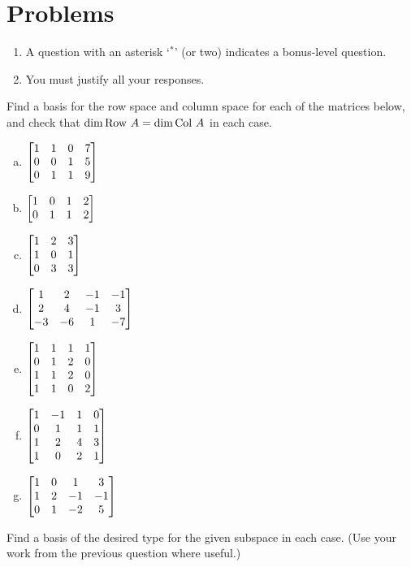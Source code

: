 
\section*{Problems}


\begin{enumerate}
\item A question with an asterisk `$ ^\ast$' (or two) indicates a bonus-level question.
 \item You must justify all your responses.
\end{enumerate}
\bigskip


 \begin{prob} \label{prob16.1} Find   a basis for the row space and column space for each of the matrices below, and check that $\dim \operatorname{Row\,} A= \dim \operatorname{Col\,} A$ in each case.
\medskip
\begin{enumerate}[a)]
\item $\bmatrix 1&1&0&7\cr 0&0&1&5\cr 0&1&1&9 \endbmatrix $
\medskip 
%
\item\sov
$\bmatrix 1&0&1&2\cr 0&1&1&2\endbmatrix $ 
\medskip
%
\item $\bmatrix 1&2&3\\1&0&1\\ 0&3&3 \endbmatrix $
\medskip
%
\item\sov $\bmatrix 1&2&-1&-1\\2&4&-1&3\\ -3&-6&1&-7\endbmatrix$
\medskip
%
\item $\bmatrix 1& 1& 1& 1\\ 0& 1& 2& 0\\ 1& 1& 2& 0\\ 1& 1& 0& 2 \endbmatrix$ \medskip
%
\item\sov $\bmatrix 1 & -1 & 1 & 0 \\
 0 & 1 & 1 & 1 \\
 1 & 2 & 4 & 3 \\
 1 & 0 & 2 & 1\endbmatrix$\medskip
%
\item $\bmatrix 1&0&1&3\\ 1&2&-1&-1\\ 0&1&-2&5\endbmatrix $\medskip
%
\end{enumerate}

\end{prob} \begin{prob} \label{prob16.2}  Find a basis of the desired type for the given subspace in each case. (Use your work from the previous question where useful.)
\medskip
\begin{enumerate}[a)]
 

\end{enumerate}
\end{prob}
